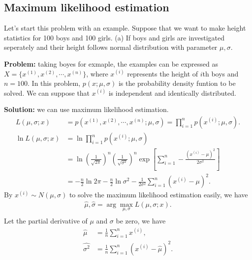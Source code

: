 \documentclass[10pt,onecolumn]{book}
\begin{document}
\subsection{Maximum likelihood estimation}
Let's start this problem with an example. Suppose that we want to make height statistics for 100 boys and 100 girls. 
(a) If boys and girls are investigated seperately and their height follows normal distribution with parameter $\mu, \sigma$.

\textbf{Problem:} taking boyes for exmaple, the examples can be expressed as $X = \{x^{(1)}, x^{(2)}, \cdots, x^{(n)}\}$, where $x^{(i)}$ represents the height of $i$th boys and $n = 100$. In this problem, $p(x;\mu, \sigma)$ is the probability density funtion to be solved. We can suppose that $x^{(i)}$ is independent and identically distributed. 

\textbf{Solution: } we can use maximum likelihood estimation.
\begin{equation}\label{eq:gmm_mle}
\begin{split}
L(\mu, \sigma; x) &= p(x^{(1)}, x^{(2)}, \cdots, x^{(n)};\mu, \sigma) = \prod_{i=1}^n p(x^{(i)};\mu, \sigma). \\
\ln L(\mu, \sigma; x) &= \ln \prod_{i=1}^n p(x^{(i)};\mu, \sigma) \\
					&= \ln (\frac{1}{\sqrt{2\pi}})^n (\frac{1}{\sqrt{\sigma^2}})^n \exp \left[\sum_{i=1}^n -\frac{(x^{(i)}-\mu)^2}{2\sigma^2}\right] \\
					&= -\frac{n}{2}\ln 2\pi - \frac{n}{2}\ln \sigma^2 - \frac{1}{2\sigma^2}\sum_{i=1}^n (x^{(i)} - \mu)^2.
\end{split} 
\end{equation}
By $x^{(i)} \sim N(\mu, \sigma)$ to solve the maximum likelihood estimation easily, we have 
\begin{equation}
\begin{split}
\hat{\mu}, \hat{\sigma} = \arg \max_{\mu, \sigma} L(\mu, \sigma; x). \\
\end{split}
\end{equation} 
Let the partial derivative of $\mu$ and $\sigma$ be zero, we have
\begin{equation}
\begin{split}
\hat{\mu} &= \frac{1}{n}\sum_{i=1}^n x^{(i)}, \\
\hat{\sigma^2} &= \frac{1}{n} \sum_{i=1}^n (x^{(i)} - \hat{\mu})^2.
\end{split}
\end{equation} 
\end{document}
